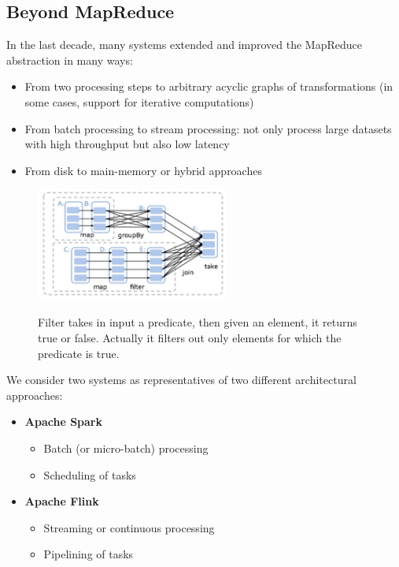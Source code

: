 \documentclass[10pt,a4paper]{article}
\begin{document}
\subsection{Beyond MapReduce}
In the last decade, many systems extended and improved the MapReduce abstraction in many ways:
\begin{itemize}
	\item From two processing steps to arbitrary acyclic graphs of transformations (in some cases, support for iterative computations)
	\item From batch processing to stream processing: not only process large datasets with high throughput but also low latency
	\item From disk to main-memory or hybrid approaches
\end{itemize}
\begin{figure}[h!]
\hfill \includegraphics[width=180pt]{images/beyond-map-reduce.png}\hspace*{\fill}
  \label{fig:beyond-map-reduce}
  \caption{Filter takes in input a predicate, then given an element, it returns true or false. Actually it filters out only elements for which the predicate is true.}
\end{figure}  \pagebreak
We consider two systems as representatives of two different architectural approaches:
\begin{itemize}
	\item \textbf{Apache Spark}
	\begin{itemize}
		\item Batch (or micro-batch) processing
		\item Scheduling of tasks
	\end{itemize}
	\item \textbf{Apache Flink}
	\begin{itemize}
		\item Streaming or continuous processing
		\item Pipelining of tasks
	\end{itemize}
\end{itemize}
\end{document}
